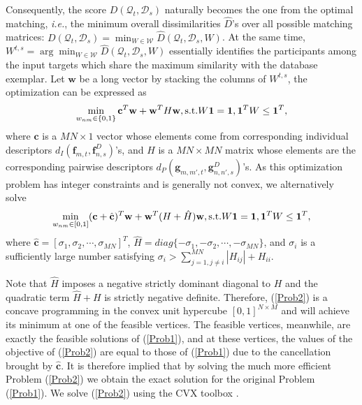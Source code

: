 Consequently, the score $D(\mathcal{Q}_{t}, \mathcal{D}_{s})$ naturally becomes the one from the optimal matching, \textit{i.e.}, the minimum overall dissimilarities $\hat{D}$'s over all possible matching matrices: $D(\mathcal{Q}_{t}, \mathcal{D}_{s})=\min_{W\in\mathcal{W}}\hat{D}(\mathcal{Q}_{t}, \mathcal{D}_{s}, W)$. At the same time, $W^{t,s}=\arg\min_{W\in\mathcal{W}}\hat{D}(\mathcal{Q}_{t}, \mathcal{D}_{s}, W)$ essentially identifies the participants among the input targets which share the maximum similarity with the database exemplar.  Let $\mathbf{w}$ be a long vector by stacking the columns of $W^{t,s}$, the optimization can be expressed as
\begin{equation}
\label{Prob1}
\min_{w_{nm}\in\{0,1\}}\mathbf{c}^{T}\mathbf{w}+\mathbf{w}^{T}H\mathbf{w},\textup{s.t.} W\mathbf{1}=\mathbf{1}, \mathbf{1}^{T}W\leq\mathbf{1}^{T},
\end{equation}
where $\mathbf{c}$ is a $MN\times 1$ vector whose elements come from corresponding individual descriptors $d_{I}(\mathbf{f}_{m,t}, \mathbf{f}^{D}_{n,s})$'s, and $H$ is a $MN\times MN$ matrix whose elements are the corresponding pairwise descriptors $d_{P}(\mathbf{g}_{m,m',t}, \mathbf{g}^{D}_{n,n',s})$'s. As this optimization problem has integer constraints and is generally not convex, we alternatively solve
\begin{equation}
\label{Prob2}
\min_{w_{nm}\in[0,1]}(\mathbf{c}+\hat{\mathbf{c}})^{T}\mathbf{w}+\mathbf{w}^{T}(H+\hat{H})\mathbf{w}, \textup{s.t.} W\mathbf{1}=\mathbf{1}, \mathbf{1}^{T}W\leq\mathbf{1}^{T},
\end{equation}
where $\hat{\mathbf{c}}=[\sigma_{1},\sigma_{2},\cdots,\sigma_{MN}]^{T}$, $\hat{H}=diag\{-\sigma_{1},-\sigma_{2},\cdots,-\sigma_{MN}\}$, and $\sigma_{i}$ is a sufficiently large number satisfying $\sigma_{i}>\sum^{MN}_{j=1,j\neq i}|H_{ij}|+H_{ii}$.

Note that $\hat{H}$ imposes a negative strictly dominant diagonal to $H$ and the quadratic term $\hat{H}+H$ is strictly negative definite. Therefore, (\ref{Prob2}) is a concave programming in the convex unit hypercube $[0,1]^{N\times M}$ and will achieve its minimum at one of the feasible vertices. The feasible vertices, meanwhile, are exactly the feasible solutions of (\ref{Prob1}), and at these vertices, the values of the objective of (\ref{Prob2}) are equal to those of (\ref{Prob1}) due to the cancellation brought by $\hat{\mathbf{c}}$. It is therefore implied that by solving the much more efficient Problem (\ref{Prob2}) we obtain the exact solution for the original Problem (\ref{Prob1}). We solve (\ref{Prob2}) using the CVX toolbox \cite{cvx}.


